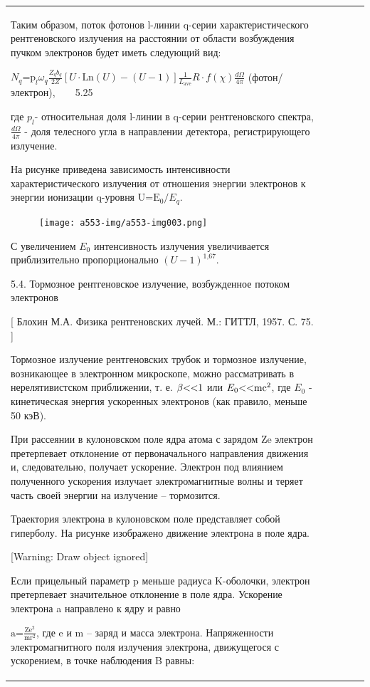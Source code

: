 \documentclass[a4paper,14pt, openany, twoside, draft]{extbook} %
\begin{document}
\begin{flushleft}
\begin{supertabular}{|m{1.7279999cm}|m{1.522cm}|m{1.522cm}|m{1.522cm}|m{1.744cm}|}
Таким образом, поток фотонов l{}-линии q{}-серии характеристического рентгеновского излучения на расстоянии от области возбуждения пучком электронов будет иметь следующий вид:

 $N_q{\text{=p}}_l\omega _q\frac{Z_qb_q}{2Z}\left[U\cdot {\text{Ln}}(U)-(U-1)\right]\frac 1{L_{{\text{ave}}}}R\cdot f(\chi )\frac{d\Omega }{4\pi }$  (фотон/электрон),\ \ \ \ 5.25

где  $p_l${}- относительная доля l{}-линии в q{}-серии рентгеновского спектра,  $\frac{d\Omega }{4\pi }$ - доля телесного угла в направлении детектора, регистрирующего излучение.

На рисунке приведена зависимость интенсивности характеристического излучения от отношения энергии электронов к энергии ионизации q{}-уровня  ${\text{U=E}}_0/E_q$.

\begin{figure}
\centering
\texttt{[image: a553-img/a553-img003.png]}
\end{figure}
С увеличением  $E_0$ интенсивность излучения увеличивается приблизительно пропорционально  $(U-1)^{\text{1,67}}$.

5.4. Тормозное рентгеновское излучение, возбужденное потоком электронов

[ Блохин М.А. Физика рентгеновских лучей. М.: ГИТТЛ, 1957. С. 75. ]

Тормозное излучение рентгеновских трубок и тормозное излучение, возникающее в электронном микроскопе, можно рассматривать в нерелятивистском приближении, т. е.  $\beta \text{{\textless}{\textless}1}$ или  $E_0\text{{\textless}{\textless}}{\text{mc}}^2$, где  $E_0$ - кинетическая энергия ускоренных электронов (как правило, меньше 50 кэВ).

При рассеянии в кулоновском поле ядра атома с зарядом Ze электрон претерпевает отклонение от первоначального направления движения и, следовательно, получает ускорение. Электрон под влиянием полученного ускорения излучает электромагнитные волны и теряет часть своей энергии на излучение – тормозится.

Траектория электрона в кулоновском поле представляет собой гиперболу. На рисунке изображено движение электрона в поле ядра.

[Warning: Draw object ignored]

Если прицельный параметр p меньше радиуса K{}-оболочки, электрон претерпевает значительное отклонение в поле ядра. Ускорение электрона a направлено к ядру и равно

 ${\text{a=}}\frac{{\text{Ze}}^2}{{\text{mr}}^2}$, где e и m – заряд и масса электрона. Напряженности электромагнитного поля излучения электрона, движущегося с ускорением, в точке наблюдения B равны:


\end{supertabular}
\end{flushleft}
\end{document}

